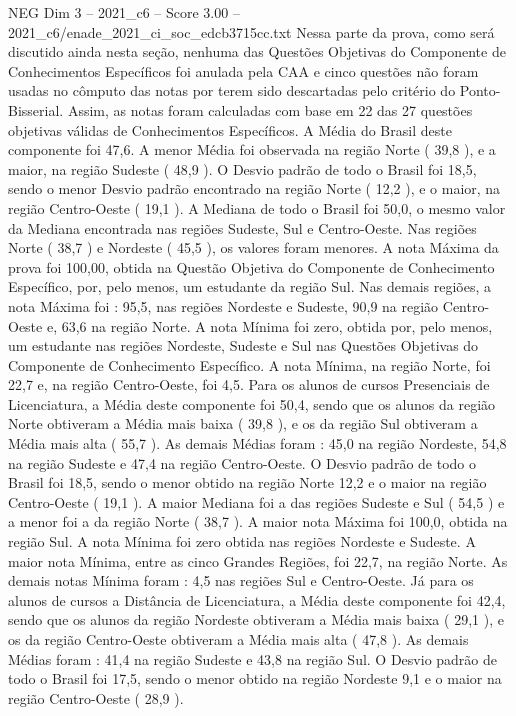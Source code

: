 \begin{textsample}{NEG Dim 3 – 2021\_c6 – Score 3.00 – 2021\_c6/enade\_2021\_ci\_soc\_edcb3715cc.txt}
Nessa parte da prova, como será discutido ainda nesta seção, nenhuma das Questões Objetivas do Componente de Conhecimentos Específicos foi anulada pela CAA e cinco questões não foram usadas no cômputo das notas por terem sido descartadas pelo critério do Ponto-Bisserial.
Assim, as notas foram calculadas com base em 22 das 27 questões objetivas válidas de Conhecimentos Específicos.
A Média do Brasil deste componente foi 47,6.
A menor Média foi observada na região Norte ( 39,8 ), e a maior, na região Sudeste ( 48,9 ).
O Desvio padrão de todo o Brasil foi 18,5, sendo o menor Desvio padrão encontrado na região Norte ( 12,2 ), e o maior, na região Centro-Oeste ( 19,1 ).
A Mediana de todo o Brasil foi 50,0, o mesmo valor da Mediana encontrada nas regiões Sudeste, Sul e Centro-Oeste.
Nas regiões Norte ( 38,7 ) e Nordeste ( 45,5 ), os valores foram menores.
A nota Máxima da prova foi 100,00, obtida na Questão Objetiva do Componente de Conhecimento Específico, por, pelo menos, um estudante da região Sul.
Nas demais regiões, a nota Máxima foi : 95,5, nas regiões Nordeste e Sudeste, 90,9 na região Centro-Oeste e, 63,6 na região Norte.
A nota Mínima foi zero, obtida por, pelo menos, um estudante nas regiões Nordeste, Sudeste e Sul nas Questões Objetivas do Componente de Conhecimento Específico.
A nota Mínima, na região Norte, foi 22,7 e, na região Centro-Oeste, foi 4,5.
Para os alunos de cursos Presenciais de Licenciatura, a Média deste componente foi 50,4, sendo que os alunos da região Norte obtiveram a Média mais baixa ( 39,8 ), e os da região Sul obtiveram a Média mais alta ( 55,7 ).
As demais Médias foram : 45,0 na região Nordeste, 54,8 na região Sudeste e 47,4 na região Centro-Oeste.
O Desvio padrão de todo o Brasil foi 18,5, sendo o menor obtido na região Norte 12,2 e o maior na região Centro-Oeste ( 19,1 ).
A maior Mediana foi a das regiões Sudeste e Sul ( 54,5 ) e a menor foi a da região Norte ( 38,7 ).
A maior nota Máxima foi 100,0, obtida na região Sul.
A nota Mínima foi zero obtida nas regiões Nordeste e Sudeste.
A maior nota Mínima, entre as cinco Grandes Regiões, foi 22,7, na região Norte.
As demais notas Mínima foram : 4,5 nas regiões Sul e Centro-Oeste.
Já para os alunos de cursos a Distância de Licenciatura, a Média deste componente foi 42,4, sendo que os alunos da região Nordeste obtiveram a Média mais baixa ( 29,1 ), e os da região Centro-Oeste obtiveram a Média mais alta ( 47,8 ).
As demais Médias foram : 41,4 na região Sudeste e 43,8 na região Sul.
O Desvio padrão de todo o Brasil foi 17,5, sendo o menor obtido na região Nordeste 9,1 e o maior na região Centro-Oeste ( 28,9 ).

\end{textsample}
